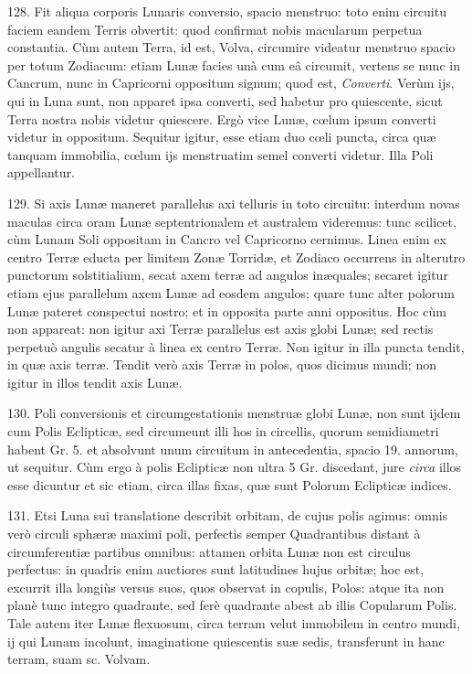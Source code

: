 \documentclass[a4paper, 11pt, oneside, polutonikogreek, german]{article}
\begin{document}
128. Fit aliqua corporis Lunaris conversio, spacio menstruo: toto enim circuitu faciem eandem Terris obvertit: quod confirmat nobis macularum perpetua constantia. Cùm autem Terra, id est, Volva, circumire videatur menstruo spacio per totum Zodiacum: etiam Lunæ facies unà cum eâ circumit, vertens se nunc in Cancrum, nunc in Capricorni oppositum signum; quod est, \emph{Converti}. Verùm ijs, qui in Luna sunt, non apparet ipsa converti, sed habetur pro quiescente, sicut Terra nostra nobis videtur quiescere. Ergò vice Lunæ, cœlum ipsum converti videtur in oppositum. Sequitur igitur, esse etiam duo cœli puncta, circa quæ tanquam immobilia, cœlum ijs menstruatim semel converti videtur. Illa Poli appellantur.

129. Si axis Lunæ maneret parallelus axi telluris in toto circuitu: interdum novas maculas circa oram Lunæ septentrionalem et australem videremus: tunc scilicet, cùm Lunam Soli oppositam in Cancro vel Capricorno cernimus. Linea enim ex centro Terræ educta per limitem Zonæ Torridæ, et Zodiaco occurrens in alterutro punctorum solstitialium, secat axem terræ ad angulos inæquales; secaret igitur etiam ejus parallelum axem Lunæ ad eosdem angulos; quare tunc alter polorum Lunæ pateret conspectui nostro; et in opposita parte anni oppositus. Hoc cùm non appareat: non igitur axi Terræ parallelus est axis globi Lunæ; sed rectis perpetuò angulis secatur à linea ex centro Terræ. Non igitur in illa puncta tendit, in quæ axis terræ. Tendit verò axis Terræ in polos, quos dicimus mundi; non igitur in illos tendit axis Lunæ.

130. Poli conversionis et circumgestationis menstruæ globi Lunæ, non sunt ijdem cum Polis Eclipticæ, sed circumeunt illi hos in circellis, quorum semidiametri habent Gr. 5. et absolvunt unum circuitum in antecedentia, spacio 19. annorum, ut sequitur. Cùm ergo à polis Eclipticæ non ultra 5 Gr. discedant, jure \emph{circa} illos esse dicuntur et sic etiam, circa illas fixas, quæ sunt Polorum Eclipticæ indices.

131. Etsi Luna sui translatione describit orbitam, de cujus polis agimus: omnis verò circuli sphæræ maximi poli, perfectis semper Quadrantibus distant à circumferentiæ partibus omnibus: attamen orbita Lunæ non est circulus perfectus: in quadris enim auctiores sunt latitudines hujus orbitæ; hoc est, excurrit illa longiùs versus suos, quos observat in copulis, Polos: atque ita non planè tunc integro quadrante, sed ferè quadrante abest ab illis Copularum Polis. Tale autem iter Lunæ flexuosum, circa terram velut immobilem in centro mundi, ij qui Lunam incolunt, imaginatione quiescentis suæ sedis, transferunt in hanc terram, suam sc. Volvam.
\end{document}
